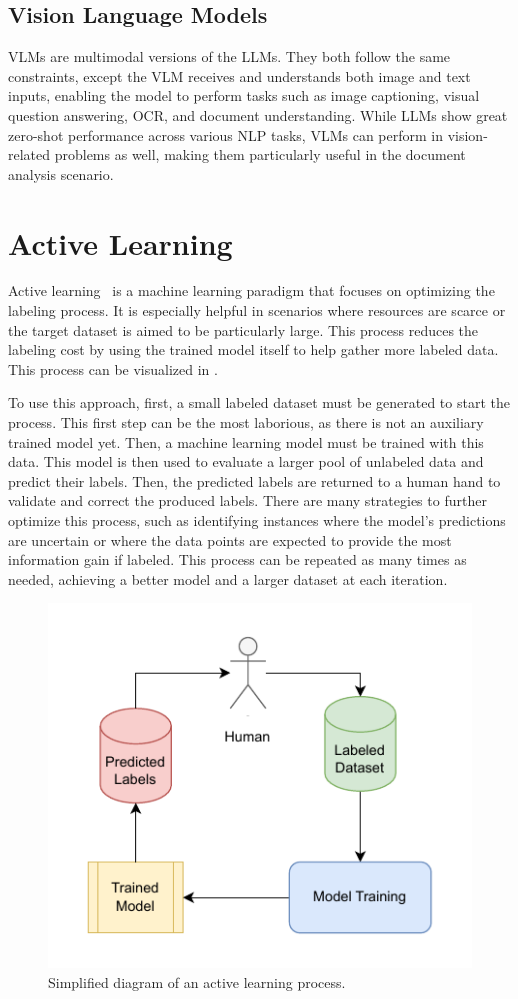 \subsection{Vision Language Models}

\glspl{VLM} are multimodal versions of the \glspl{LLM}. They both follow the same constraints, except the \gls{VLM} receives and understands both image and text inputs, enabling the model to perform tasks such as image captioning, visual question answering, \gls{OCR}, and document understanding. While \glspl{LLM} show great zero-shot performance across various \gls{NLP} tasks, \glspl{VLM} can perform in vision-related problems as well, making them particularly useful in the document analysis scenario.

\section{Active Learning}
\label{sec:active_learning}

Active learning~\cite{settles_active_2009} is a machine learning paradigm that focuses on optimizing the labeling process. It is especially helpful in scenarios where resources are scarce or the target dataset is aimed to be particularly large. This process reduces the labeling cost by using the trained model itself to help gather more labeled data. This process can be visualized in .

To use this approach, first, a small labeled dataset must be generated to start the process. This first step can be the most laborious, as there is not an auxiliary trained model yet. Then, a machine learning model must be trained with this data. This model is then used to evaluate a larger pool of unlabeled data and predict their labels. Then, the predicted labels are returned to a human hand to validate and correct the produced labels. There are many strategies to further optimize this process, such as identifying instances where the model's predictions are uncertain or where the data points are expected to provide the most information gain if labeled. This process can be repeated as many times as needed, achieving a better model and a larger dataset at each iteration.

\begin{figure}[htbp]
\centering
\includegraphics[width=.6\linewidth]{images/active_learning.drawio.pdf}
\caption{Simplified diagram of an active learning process.}
\label{fig:activelearning}
\end{figure}